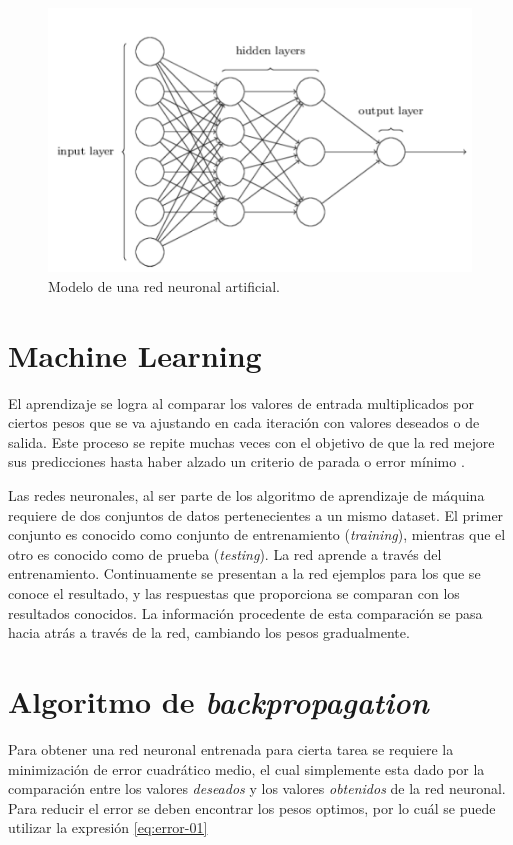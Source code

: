 \documentclass[a4paper,12pt,twocolumn]{article}
\begin{document}
  \begin{figure}[ht!]
    \centering
    \includegraphics[width=0.8\linewidth]{red-neuronal}
    \caption{Modelo de una red neuronal artificial.}
    \label{fig:red-neuronal}
  \end{figure}

  \section{Machine Learning}

  El aprendizaje se logra al comparar los valores de entrada multiplicados por
  ciertos pesos que se va ajustando en cada iteración con valores deseados o de
  salida. Este proceso se repite muchas veces con el objetivo de que la red
  mejore sus predicciones hasta haber alzado un criterio de parada o error
  mínimo \cite{online01}.

  Las redes neuronales, al ser parte de los algoritmo de aprendizaje de máquina
  requiere de dos conjuntos de datos pertenecientes a un mismo dataset. El
  primer conjunto es conocido como conjunto de entrenamiento (\textit{training}),
  mientras que el otro es conocido como de prueba (\textit{testing}). La red
  aprende a través del entrenamiento. Continuamente se presentan a la red
  ejemplos para los que se conoce el resultado, y las respuestas que proporciona
  se comparan con los resultados conocidos. La información procedente de esta
  comparación se pasa hacia atrás a través de la red, cambiando los pesos
  gradualmente.

  \section{Algoritmo de \textit{backpropagation}}

  Para obtener una red neuronal entrenada para cierta tarea se requiere la
  minimización de error cuadrático medio, el cual simplemente esta dado por la
  comparación entre los valores \textit{deseados} y los valores
  \textit{obtenidos} de la red neuronal. Para reducir el error se deben
  encontrar los pesos optimos, por lo cuál se puede utilizar la expresión
  \ref{eq:error-01}
\end{document}
